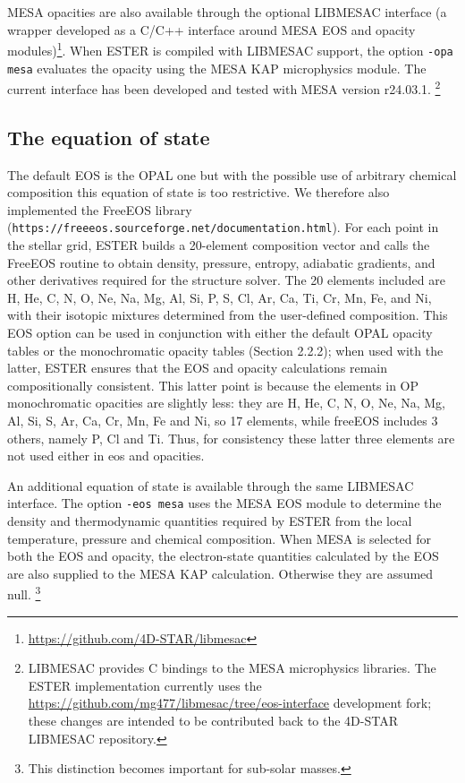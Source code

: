 MESA opacities are also available through the optional LIBMESAC interface
(a wrapper developed as a C/C++ interface around MESA EOS and opacity modules)\footnote{\url{https://github.com/4D-STAR/libmesac}}.
When ESTER is compiled with LIBMESAC support, the option {\tt -opa mesa}
evaluates the opacity using the MESA KAP microphysics module. The current
interface has been developed and tested with MESA version r24.03.1.
\footnote{LIBMESAC provides C bindings to the MESA microphysics libraries.
The ESTER implementation currently uses the \url{https://github.com/mg477/libmesac/tree/eos-interface} development
fork; these changes are intended to be contributed back to the 4D-STAR
LIBMESAC repository.}

\subsection{The equation of state}

The default EOS is the OPAL one but with the possible use of arbitrary chemical
composition this equation of state is too restrictive. We therefore also
implemented the FreeEOS library
({\tt https://freeeos.sourceforge.net/documentation.html}). For each point
in the stellar grid, ESTER builds a 20-element composition vector and
calls the FreeEOS routine to obtain density, pressure, entropy, adiabatic
gradients, and other derivatives required for the structure solver. The 20
elements included are H, He, C, N, O, Ne, Na, Mg, Al, Si, P, S, Cl, Ar,
Ca, Ti, Cr, Mn, Fe, and Ni, with their isotopic mixtures determined from
the user-defined composition. This EOS option can be used in conjunction
with either the default OPAL opacity tables or the monochromatic opacity
tables (Section 2.2.2); when used with the latter, ESTER ensures that
the EOS and opacity calculations remain compositionally consistent.
This latter point is because the elements in OP monochromatic opacities
are slightly less: they are H, He, C, N, O, Ne, Na, Mg, Al, Si, S, Ar,
Ca, Cr, Mn, Fe and Ni, so 17 elements, while freeEOS includes 3 others,
namely P, Cl and Ti. Thus, for consistency these latter three elements
are not used either in eos and opacities.

An additional equation of state is available through the same LIBMESAC
interface. The option {\tt -eos mesa} uses the MESA EOS module to determine
the density and thermodynamic quantities required by ESTER from the local
temperature, pressure and chemical composition. When MESA is selected for
both the EOS and opacity, the electron-state quantities calculated by the
EOS are also supplied to the MESA KAP calculation. Otherwise they are assumed null.
\footnote{This distinction becomes important for sub-solar masses.}

